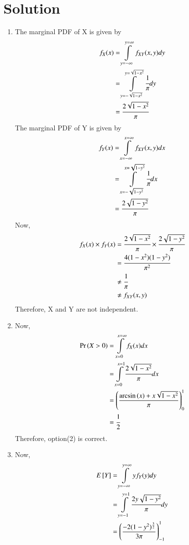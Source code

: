 \documentclass[journal,12pt,twocolumn]{IEEEtran}
\begin{document}
\section*{\textbf{Solution}}
\begin{enumerate}
    \item 
The marginal PDF of X is given by
\begin{align}
    f_X(x)&=\displaystyle\int\limits_{y=-\infty}^{y=\infty} f_{XY}(x,y) dy\\
          &=\displaystyle\int\limits_{y=-\sqrt{1-x^2}}^{y=\sqrt{1-x^2}}\cfrac{1}{\pi} dy\\
          &=\cfrac{2\sqrt{1-x^2}}{\pi}
\end{align}
The marginal PDF of Y is given by
\begin{align}
    f_Y(x)&=\displaystyle\int\limits_{x=-\infty}^{x=\infty} f_{XY}(x,y) dx\\
          &=\displaystyle\int\limits_{x=-\sqrt{1-y^2}}^{x=\sqrt{1-y^2}}\cfrac{1}{\pi} dx\\
          &=\cfrac{2\sqrt{1-y^2}}{\pi}
\end{align}
Now,
\begin{align}
    f_X(x)\times f_Y(x) &=\cfrac{2\sqrt{1-x^2}}{\pi} \times\cfrac{2\sqrt{1-y^2}}{\pi}\\
    &= \cfrac{4(1-x^2)(1-y^2)}{\pi^2}\\
    &\neq \cfrac{1}{\pi}\\
    &\neq f_{XY}(x,y)
\end{align}
Therefore, X and Y are not independent.\\
\item
Now,
\begin{align}
    \Pr\left(X>0\right)&=\displaystyle\int\limits_{x=0}^{x=\infty}f_X(x)dx\\
    &=\displaystyle\int\limits_{x=0}^{x=1}\cfrac{2\sqrt{1-x^2}}{\pi} dx\\
    &=\left(\frac{\arcsin{(x)}+x\sqrt{1-x^2}}{\pi}\right)_{0}^{1}\\
    &=\cfrac{1}{2}
\end{align}
Therefore, option(2) is correct.\\
\item
Now,
\begin{align}
    E\sbrak{Y}&=\displaystyle\int\limits_{y=-\infty}^{y=\infty}yf_Y(y)dy\\
    &=\displaystyle\int\limits_{y=-1}^{y=1}\cfrac{2y\sqrt{1-y^2}}{\pi}dy\\
    &=\brak{\frac{-2(1-y^2)^{\frac{3}{2}}}{3\pi}}_{-1}^{1}\\

\end{align}
\end{enumerate}
\end{document}
